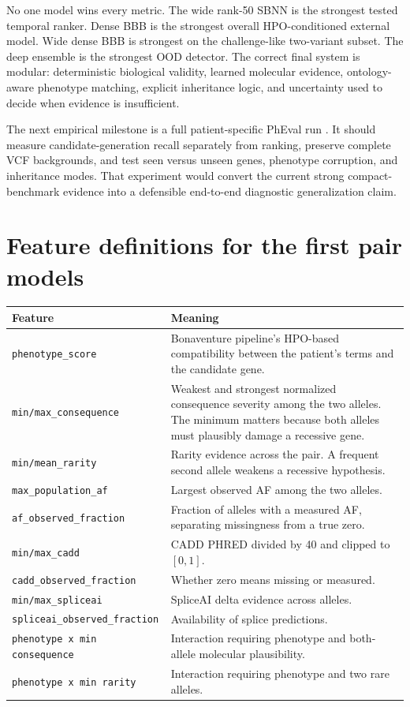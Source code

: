 \documentclass[11pt]{article}
\newcommand{\code}[1]{\texttt{#1}}
\begin{document}
No one model wins every metric. The wide rank-50 SBNN is the strongest tested temporal ranker. Dense BBB is the strongest overall HPO-conditioned external model. Wide dense BBB is strongest on the challenge-like two-variant subset. The deep ensemble is the strongest OOD detector. The correct final system is modular: deterministic biological validity, learned molecular evidence, ontology-aware phenotype matching, explicit inheritance logic, and uncertainty used to decide when evidence is insufficient.

The next empirical milestone is a full patient-specific PhEval run \citep{pheval2025}. It should measure candidate-generation recall separately from ranking, preserve complete VCF backgrounds, and test seen versus unseen genes, phenotype corruption, and inheritance modes. That experiment would convert the current strong compact-benchmark evidence into a defensible end-to-end diagnostic generalization claim.

\appendix
\section{Feature definitions for the first pair models}

\small
\begin{longtable}{p{}p{}}
\toprule
Feature & Meaning \\
\midrule
\code{phenotype\_score} & Bonaventure pipeline's HPO-based compatibility between the patient's terms and the candidate gene. \\
\code{min/max\_consequence} & Weakest and strongest normalized consequence severity among the two alleles. The minimum matters because both alleles must plausibly damage a recessive gene. \\
\code{min/mean\_rarity} & Rarity evidence across the pair. A frequent second allele weakens a recessive hypothesis. \\
\code{max\_population\_af} & Largest observed AF among the two alleles. \\
\code{af\_observed\_fraction} & Fraction of alleles with a measured AF, separating missingness from a true zero. \\
\code{min/max\_cadd} & CADD PHRED divided by 40 and clipped to $[0,1]$. \\
\code{cadd\_observed\_fraction} & Whether zero means missing or measured. \\
\code{min/max\_spliceai} & SpliceAI delta evidence across alleles. \\
\code{spliceai\_observed\_fraction} & Availability of splice predictions. \\
\code{phenotype x min consequence} & Interaction requiring phenotype and both-allele molecular plausibility. \\
\code{phenotype x min rarity} & Interaction requiring phenotype and two rare alleles. \\
\bottomrule
\end{longtable}
\normalsize
\end{document}
